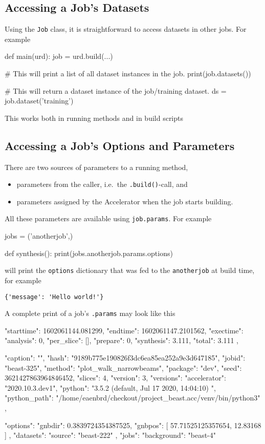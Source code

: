 \subsection{Accessing a Job's Datasets}
Using the \texttt{Job} class, it is straightforward to access datasets
in other jobs.  For example
\begin{python}
def main(urd):
    job = urd.build(...)

    # This will print a list of all dataset instances in the job.
    print(job.datasets())

    # This will return a dataset instance of the job/training dataset.
    ds = job.dataset('training')
\end{python}
This works both in running methods and in build scripts


\subsection{Accessing a Job's Options and Parameters}
\label{sec:params}
There are two sources of parameters to a running method,
\begin{itemize}
\item [] parameters from the caller, i.e.\ the \texttt{.build()}-call,
  and
\item [] parameters assigned by the Accelerator when the job starts
  building.
\end{itemize}
All these parameters are available using \texttt{job.params}.  For
example
\begin{python}
jobs = ('anotherjob',)

def synthesis():
    print(jobs.anotherjob.params.options)
\end{python}
will print the \texttt{options} dictionary that was fed to the
\texttt{anotherjob} at build time, for example
\begin{snugshade}
\begin{verbatim}
{'message': 'Hello world!'}
\end{verbatim}
\end{snugshade}
\noindent A complete print of a job's \texttt{.params} may look like this
\begin{json}
{
    "starttime": 1602061144.081299,
    "endtime": 1602061147.2101562,
    "exectime": {
        "analysis": 0,
        "per_slice": [],
        "prepare": 0,
        "synthesis": 3.111,
        "total": 3.111
    },

    "caption": "",
    "hash": "9189b775e190826f3dc6ea85ea252a9e3d647185",
    "jobid": "beast-325",
    "method": "plot_walk_narrowbeams",
    "package": "dev",
    "seed": 3621427863964846452,
    "slices": 4,
    "version": 3,
    "versions": {
        "accelerator": "2020.10.3.dev1",
        "python": "3.5.2 (default, Jul 17 2020, 14:04:10) \n[GCC 5.4.0 20160609]",
        "python_path": "/home/eaenbrd/checkout/project_beast.acc/venv/bin/python3"
    },

    "options": {
        "gnbdir": 0.3839724354387525,
        "gnbpos": [
            57.71525125357654,
            12.83168
        ]
    },
    "datasets": {
        "source": "beast-222"
    },
    "jobs": {
        "background": "beast-4"
    }
}
\end{json}

